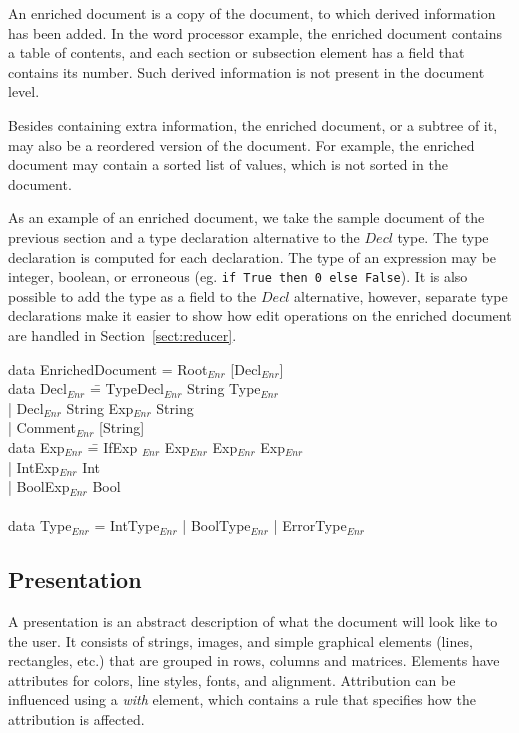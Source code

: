 An enriched document is a copy of the document, to which derived information has been added. In the word processor example, the enriched document contains a table of contents, and each section or subsection element has a field that contains its number. Such derived information is not present in the document level.

Besides containing extra information, the enriched document, or a subtree of it, may also be a reordered version of the document. For example, the enriched document may contain a sorted list of values, which is not sorted in the document.

As an example of an enriched document, we take the sample document of the previous section and a type declaration alternative to the $Decl$ type. The type declaration is computed for each declaration. The type of an expression may be integer, boolean, or erroneous (eg. {\tt if True then 0 else False}). It is also possible to add the type as a field to the $Decl$ alternative, however, separate type declarations make it easier to show how edit operations on the enriched document are handled in Section~\ref{sect:reducer}.

\noindent
\ttfamily
\begin{tabbing}
data EnrichedDocument = Root$_{Enr}$ [Decl$_{Enr}$]\\
data Decl$_{Enr}$ \= = TypeDecl$_{Enr}$ String Type$_{Enr}$\\
                           \> | Decl$_{Enr}$ String Exp$_{Enr}$ String\\
                           \> | Comment$_{Enr}$ [String]\\
data Exp$_{Enr}$ \= =  IfExp $_{Enr}$ Exp$_{Enr}$ Exp$_{Enr}$ Exp$_{Enr}$\\
                 \> | IntExp$_{Enr}$ Int\\
                 \> | BoolExp$_{Enr}$ Bool\\
\\
data Type$_{Enr}$ = IntType$_{Enr}$ | BoolType$_{Enr}$ | ErrorType$_{Enr}$
\end{tabbing}
\rmfamily

\subsection{Presentation} \label{sect:presLevel}

A presentation is an abstract description of what the document will look like to the user. It consists of strings, images, and simple graphical elements (lines, rectangles, etc.) that are grouped in rows, columns and matrices. Elements have attributes for colors, line styles, fonts, and alignment. Attribution can be influenced using a {\em with} element, which contains a rule that specifies how the attribution is affected.

